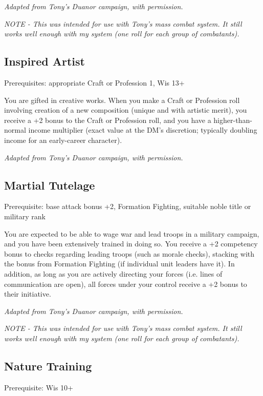 \textit{Adapted from Tony's Duanor campaign, with permission.}

\textit{NOTE - This was intended for use with Tony's mass combat system.
It still works well enough with my system (one roll for each group of
combatants).}
%

%
\subsection{Inspired Artist}

Prerequisites: appropriate Craft or Profession 1, Wis 13+

You are gifted in creative works. When you make a Craft or Profession roll
involving creation of a new composition (unique and with artistic merit),
you receive a +2 bonus to the Craft or Profession roll, and you have a
higher-than-normal income multiplier (exact value at the DM's discretion;
typically doubling income for an early-career character).

\textit{Adapted from Tony's Duanor campaign, with permission.}
%

%
\subsection{Martial Tutelage}

Prerequisite: base attack bonus +2, Formation Fighting,
suitable noble title or military rank

You are expected to be able to wage war and lead troops in a military
campaign, and you have been extensively trained in doing so. You receive
a +2 competency bonus to checks regarding leading troops (such as morale
checks), stacking with the bonus from Formation Fighting (if individual
unit leaders have it). In addition, as long as you are actively directing
your forces (i.e. lines of communication are open), all forces under your
control receive a +2 bonus to their initiative.

\textit{Adapted from Tony's Duanor campaign, with permission.}

\textit{NOTE - This was intended for use with Tony's mass combat system.
It still works well enough with my system (one roll for each group of
combatants).}
%

%
\subsection{Nature Training}

Prerequisite: Wis 10+

